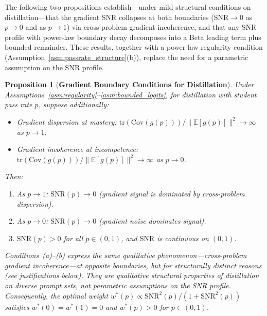 \documentclass{article}
\newtheorem{proposition}[theorem]{Proposition}
\begin{document}
The following two propositions establish---under mild structural conditions on distillation---that the gradient SNR collapses at both boundaries ($\text{SNR} \to 0$ as $p \to 0$ and as $p \to 1$) via cross-problem gradient incoherence, and that any SNR profile with power-law boundary decay decomposes into a Beta leading term plus bounded remainder. These results, together with a power-law regularity condition (Assumption~\ref{asm:passrate_structure}(b)), replace the need for a parametric assumption on the SNR profile.

\begin{proposition}[\textbf{Gradient Boundary Conditions for Distillation}]
\label{prop:boundary}
Under Assumptions~\ref{asm:regularity}--\ref{asm:bounded_logits}, for distillation with student pass rate $p$, suppose additionally:
\begin{itemize}
  \item[\emph{(a)}] \emph{Gradient dispersion at mastery:} $\text{tr}(\text{Cov}(g(p)))/\|\mathbb{E}[g(p)]\|^2 \to \infty$ as $p \to 1$.
  \item[\emph{(b)}] \emph{Gradient incoherence at incompetence:} $\text{tr}(\text{Cov}(g(p)))/\|\mathbb{E}[g(p)]\|^2 \to \infty$ as $p \to 0$.
\end{itemize}
Then:
\begin{enumerate}
  \item[\emph{(i)}] As $p \to 1$: $\text{SNR}(p) \to 0$ (gradient signal is dominated by cross-problem dispersion).
  \item[\emph{(ii)}] As $p \to 0$: $\text{SNR}(p) \to 0$ (gradient noise dominates signal).
  \item[\emph{(iii)}] $\text{SNR}(p) > 0$ for all $p \in (0,1)$, and $\text{SNR}$ is continuous on $(0,1)$.
\end{enumerate}
Conditions~(a)--(b) express the same qualitative phenomenon---\emph{cross-problem gradient incoherence}---at opposite boundaries, but for structurally distinct reasons (see justifications below). They are qualitative structural properties of distillation on diverse prompt sets, not parametric assumptions on the SNR profile. Consequently, the optimal weight $w^*(p) \propto \text{SNR}^2(p)/(1+\text{SNR}^2(p))$ satisfies $w^*(0) = w^*(1) = 0$ and $w^*(p) > 0$ for $p \in (0,1)$.
\end{proposition}
\end{document}
